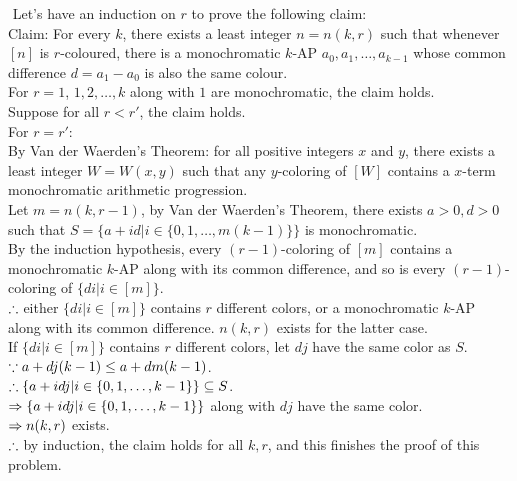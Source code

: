\setcounter{pr}{0}
\begin{pr}$ $
Let's have an induction on $r$ to prove the following claim:\\
Claim: For every $k$, there exists a least integer $n=n(k, r)$ such that whenever $[n]$ is $r$-coloured, there is a monochromatic $k$-AP $a_0, a_1, \dots, a_{k-1}$ whose common difference $d=a_1-a_0$ is also the same colour.\\
For $r=1$, $1, 2, \dots, k$ along with $1$ are monochromatic, the claim holds.\\
Suppose for all $r<r'$, the claim holds.\\
For $r=r'$:\\
By Van der Waerden's Theorem: for all positive integers $x$ and $y$, there exists a least integer $W=W(x, y)$ such that any $y$-coloring of $[W]$ contains a $x$-term monochromatic arithmetic progression.\\
Let $m=n(k, r-1)$, by Van der Waerden's Theorem, there exists $a>0, d>0$ such that $S=\{a+id|i\in\{0, 1, \dots, m(k-1)\}\}$ is monochromatic.\\
By the induction hypothesis, every $(r-1)$-coloring of $[m]$ contains a monochromatic $k$-AP along with its common difference, and so is every $(r-1)$-coloring of $\{di|i\in[m]\}$.\\
$\therefore$ either $\{di|i\in[m]\}$ contains $r$ different colors, or a monochromatic $k$-AP along with its common difference. $n(k, r)$ exists for the latter case.\\
If $\{di|i\in[m]\}$ contains $r$ different colors, let $dj$ have the same color as $S$.\\
$\because a+dj(k-1)\leq a+dm(k-1)$.\\
$\therefore\{a+idj|i\in\{0, 1, \dots, k-1\}\}\subseteq S$.\\
$\Rightarrow\{a+idj|i\in\{0, 1, \dots, k-1\}\}$ along with $dj$ have the same color.\\
$\Rightarrow n(k, r)$ exists.\\
$\therefore$ by induction, the claim holds for all $k, r$, and this finishes the proof of this problem.
\end{pr}
